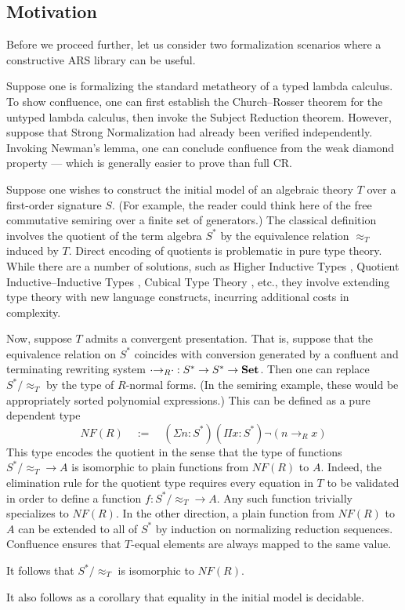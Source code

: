 \subsection{Motivation}

Before we proceed further, let us consider two formalization scenarios where
a constructive ARS library can be useful.

\begin{example}
Suppose one is formalizing the standard metatheory of
a typed lambda calculus.  To show confluence, one can
first establish the Church--Rosser theorem for the untyped lambda calculus,
then invoke the Subject Reduction theorem.
However, suppose that Strong Normalization had already been verified independently.
Invoking Newman's lemma, one can conclude confluence from the weak
diamond property --- which is generally easier to prove than full CR.
\end{example}

\begin{example}
Suppose one wishes to construct the initial model of an algebraic theory $T$
over a first-order signature $S$.
(For example, the reader could think here of the free commutative semiring over a finite set of generators.)
The classical definition involves the quotient of the term algebra $S^*$ by
the equivalence relation $\approx_T$ induced by $T$.
Direct encoding of quotients is problematic in pure type theory.
While there are a number of solutions, such as Higher Inductive Types \cite{HoTT},
Quotient Inductive--Inductive Types \cite{QIIT}, Cubical Type Theory \cite{CTT}, etc.,
they involve extending type theory with new language constructs,
incurring additional costs in complexity.

Now, suppose $T$ admits a convergent presentation.
That is, suppose that the equivalence relation on $S^*$ coincides
with conversion generated by a confluent and terminating rewriting system
${\cdot}{\to_R}{\cdot} : S^* \to S^* \to \mathbf{Set}$.
Then one can replace $S^*/{\approx_T}$ by the type of $R$-normal forms.
(In the semiring example, these would be appropriately sorted polynomial expressions.)
This can be defined as a pure dependent type
\[ NF(R) \quad := \quad (\Sigma n : S^*) (\Pi x : S^*) \lnot (n \to_R x) \]
This type encodes the quotient in the sense that the type of functions $S^*/{\approx_T} \to A$ is isomorphic to plain functions from $NF(R)$ to $A$.
Indeed, the elimination rule for the quotient type requires every equation in $T$
to be validated in order to define a function $f : S^*/{\approx_T} \to A$.
Any such function trivially specializes to $NF(R)$.  In the other direction,
a plain function from $NF(R)$ to $A$
can be extended to all of $S^*$ by induction on normalizing reduction sequences.
Confluence ensures that $T$-equal elements are always mapped to the same value.

It follows that $S^*/{\approx_T}$ is isomorphic to $NF(R)$.

It also follows as a corollary that equality in the initial model is decidable.
\end{example}


